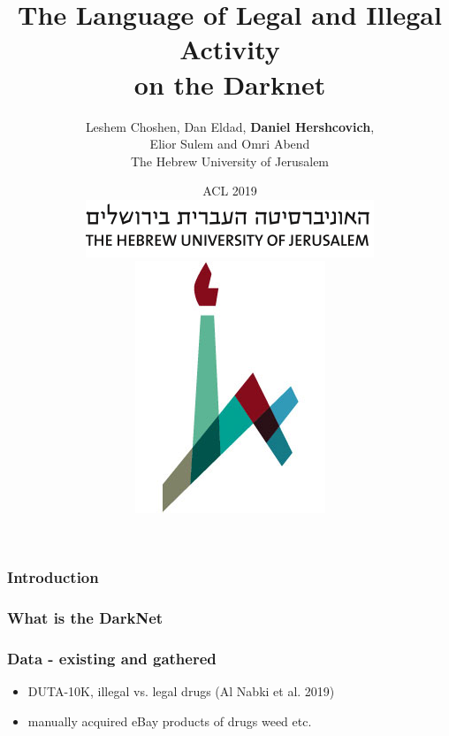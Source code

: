 \documentclass[t,xcolor={svgnames,table}]{beamer}
\begin{document}
\title[]{The Language of Legal and Illegal Activity \\ on the Darknet}
\author[Daniel Hershcovich]{Leshem Choshen, Dan Eldad, \textbf{Daniel Hershcovich}, \\
Elior Sulem and Omri Abend \\
The Hebrew University of Jerusalem}
\date[]{ACL 2019 \\
\includegraphics[width=.5\textwidth]{huji_banner.png}
\includegraphics[width=.1\textwidth]{huji_logo.jpg}}

\begin{frame}
\titlepage
\end{frame}

\begin{frame}
\frametitle{Introduction}
\end{frame}

{%
\begin{frame}
	\frametitle{What is the DarkNet}
\end{frame}
}
\begin{frame}
	\frametitle{Data - existing and gathered}
	\begin{itemize}
		\item DUTA-10K, illegal vs. legal drugs (Al Nabki et al. 2019)
		\item manually acquired eBay products of drugs weed etc.
	\end{itemize}
\end{frame}
\end{document}
